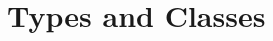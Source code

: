 %
%

\section{Types and Classes} 


\begin{figure}
  \begin{center}
    \begin{sideways}

\end{sideways}
\end{center}
\end{figure}
